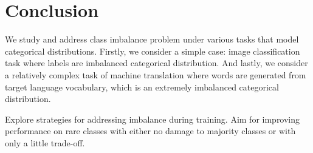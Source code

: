 \chapter{Conclusion}
\label{ch:conclusion}

We study and address class imbalance problem under various tasks that model categorical distributions.
Firstly, we consider a simple case: image classification task where labels are imbalanced categorical distribution.
And lastly, we consider a relatively complex task of machine translation where words are generated from target language vocabulary, which is an extremely imbalanced categorical distribution.

Explore strategies for addressing imbalance during training. 
Aim for improving performance on rare classes with either no damage to majority classes or with only a little trade-off. 

